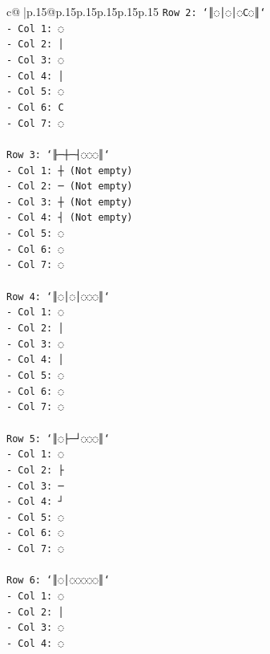 \documentclass{article}
\begin{document}
{\begin{supertabular}{c@{$\;$}|p{.15\linewidth}@{}p{.15\linewidth}p{.15\linewidth}p{.15\linewidth}p{.15\linewidth}p{.15\linewidth}}
{{{\texttt{Row 2: `║◌│◌│◌C◌║`} \\
\texttt{{-} Col 1: ◌} \\
\texttt{{-} Col 2: │} \\
\texttt{{-} Col 3: ◌} \\
\texttt{{-} Col 4: │} \\
\texttt{{-} Col 5: ◌} \\
\texttt{{-} Col 6: C} \\
\texttt{{-} Col 7: ◌} \\
\\ 
\texttt{Row 3: `╟─┼─┤◌◌◌║`} \\
\texttt{{-} Col 1: ┼ (Not empty)} \\
\texttt{{-} Col 2: ─ (Not empty)} \\
\texttt{{-} Col 3: ┼ (Not empty)} \\
\texttt{{-} Col 4: ┤ (Not empty)} \\
\texttt{{-} Col 5: ◌} \\
\texttt{{-} Col 6: ◌} \\
\texttt{{-} Col 7: ◌} \\
\\ 
\texttt{Row 4: `║◌│◌│◌◌◌║`} \\
\texttt{{-} Col 1: ◌} \\
\texttt{{-} Col 2: │} \\
\texttt{{-} Col 3: ◌} \\
\texttt{{-} Col 4: │} \\
\texttt{{-} Col 5: ◌} \\
\texttt{{-} Col 6: ◌} \\
\texttt{{-} Col 7: ◌} \\
\\ 
\texttt{Row 5: `║◌├─┘◌◌◌║`} \\
\texttt{{-} Col 1: ◌} \\
\texttt{{-} Col 2: ├} \\
\texttt{{-} Col 3: ─} \\
\texttt{{-} Col 4: ┘} \\
\texttt{{-} Col 5: ◌} \\
\texttt{{-} Col 6: ◌} \\
\texttt{{-} Col 7: ◌} \\
\\ 
\texttt{Row 6: `║◌│◌◌◌◌◌║`} \\
\texttt{{-} Col 1: ◌} \\
\texttt{{-} Col 2: │} \\
\texttt{{-} Col 3: ◌} \\
\texttt{{-} Col 4: ◌} \\
}}}
\end{supertabular}}
\end{document}
